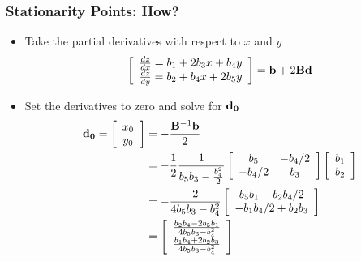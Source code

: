 \documentclass{beamer}\usepackage[]{graphicx}\usepackage[]{color}
\begin{document}
\begin{frame}
\frametitle{Stationarity Points: How?}
\begin{itemize}
\item Take the partial derivatives with respect to $x$ and $y$
\begin{align*}
\left[ \begin{array}{cc}
\frac{dz}{dx} = b_1 + 2b_{3}x + b_{4}y \\
\frac{dz}{dy} = b_2 + b_{4}x + 2b_{5}y
\end{array} \right]
& = {\bf b} + 2 {\bf B d} \\
\end{align*}

\item Set the derivatives to zero and solve for ${\bf d_0}$
\begin{align*}
{\bf d_0} = \left[ \begin{array}{cc}
x_0  \\
y_0 
\end{array} \right]
%
& = -\frac{{\bf B}^{-1} {\bf b}}{2} \\
& = -\frac{1}{2} \frac{1}{b_5 b_3 - \frac{b_4^2}{2}}
\left[ \begin{array}{cc}
b_5 & -b_4 /2 \\
-b_4 /2 & b_3
\end{array} \right] 
\left[ \begin{array}{cc}
b_1  \\
b_2 
\end{array} \right] \\
& = -\frac{2}{4 b_5 b_3 - b_4^2}
\left[ \begin{array}{cc}
b_5 b_1 - b_2 b_4 /2 \\
-b_1 b_4 /2 + b_2 b_3
\end{array} \right] \\
& = 
\left[ \begin{array}{cc}
\frac{b_2 b_4 - 2 b_5 b_1}{4 b_5 b_3 - b_4^2} \\
\frac{b_1 b_4 + 2 b_2 b_3}{4 b_5 b_3 - b_4^2}
\end{array} \right] \\
\end{align*}

\end{itemize}
\end{frame}
\end{document}
